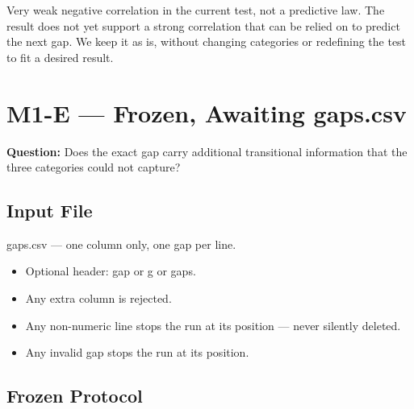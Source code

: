 \documentclass[12pt,a4paper]{article}
\begin{document}
Very weak negative correlation in the current test, not a predictive law. The result does not yet support a strong correlation that can be relied on to predict the next gap. We keep it as is, without changing categories or redefining the test to fit a desired result.

\section{M1-E — Frozen, Awaiting gaps.csv}

\textbf{Question:} Does the exact gap carry additional transitional information that the three categories could not capture?

\subsection{Input File}

gaps.csv — one column only, one gap per line.

\begin{itemize}
\item Optional header: gap or g or gaps.
\item Any extra column is rejected.
\item Any non-numeric line stops the run at its position — never silently deleted.
\item Any invalid gap stops the run at its position.
\end{itemize}

\subsection{Frozen Protocol}
\end{document}
